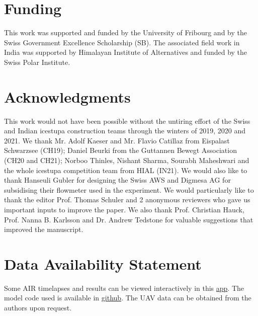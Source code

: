 \documentclass[utf8]{frontiersSCNS} %
\begin{document}
\section*{Funding} This work was supported and funded by the University of Fribourg and by the Swiss Government
Excellence Scholarship (SB). The associated field work in India was supported by Himalayan Institute of
Alternatives and funded by the Swiss Polar Institute.

\section*{Acknowledgments} This work would not have been possible without the untiring effort of the Swiss and
Indian icestupa construction teams through the winters of 2019, 2020 and 2021. We thank Mr. Adolf Kaeser and Mr.
Flavio Catillaz from Eispalast Schwarzsee (CH19); Daniel Beurki from the Guttannen Bewegt Association (CH20 and
CH21); Norboo Thinles, Nishant Sharma, Sourabh Maheshwari and the whole icestupa competition team from HIAL (IN21).
We would also like to thank Hanseuli Gubler for designing the Swiss AWS and Digmesa AG for subsidising their
flowmeter used in the experiment.  We would particularly like to thank the editor Prof. Thomas Schuler and 2
anonymous reviewers who gave us important inputs to improve the paper. We also thank Prof. Christian Hauck, Prof.
Nanna B. Karlsson and Dr.  Andrew Tedstone for valuable suggestions that improved the manuscript.

\section*{Data Availability Statement} Some AIR timelapses and results can be viewed interactively in this
\href{https://share.streamlit.io/gayashiva/air_model/src/visualization/webApp.py}{app}.  The model code used is
available in \href{https://github.com/Gayashiva/air_model}{github}. The UAV data can be obtained from the authors upon
request.

 
\end{document}
